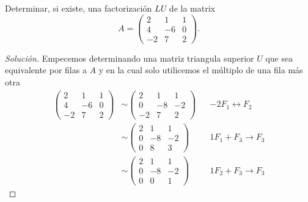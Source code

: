 \documentclass[a4,11pt]{aleph-notas}
\begin{document}
\encabezado

\begin{ejer}
    Determinar, si existe, una factorización $LU$ de la matrix
    \[
        A = 
        \begin{pmatrix}
             2 &  1 & 1\\
             4 & -6 & 0\\
            -2 &  7 & 2
        \end{pmatrix}.
    \]
\end{ejer}

\begin{proof}[Solución]
    Empecemos determinando una matriz triangula superior $U$ que sea equivalente por filas a $A$ y en la cual solo utilicemos el múltiplo de una fila más otra 
    \begin{align*}
        \begin{pmatrix}
             2 &  1 & 1\\
             4 & -6 & 0\\
            -2 &  7 & 2
        \end{pmatrix}
        & \sim 
        \begin{pmatrix}
             2 &  1 & 1\\
             0 & -8 & -2\\
            -2 &  7 & 2
        \end{pmatrix}
        && -2F_1\leftrightarrow F_2\\
        & \sim 
        \begin{pmatrix}
             2 &  1 & 1\\
             0 & -8 & -2\\
             0 &  8 & 3
        \end{pmatrix}
        && 1F_1+F_3\to F_3\\
        & \sim 
        \begin{pmatrix}
             2 &  1 & 1\\
             0 & -8 & -2\\
             0 &  0 & 1
        \end{pmatrix}
        && 1F_2 + F_3 \to F_3
    \end{align*}


\end{proof}
\end{document}
